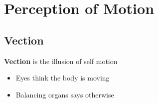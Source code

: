\section{Perception of Motion}

  \subsection{Vection}

    \textbf{Vection} is the illusion of self motion

    \begin{itemize}
      \item Eyes think the body is moving
      \item Balancing organs says otherwise
    \end{itemize}
